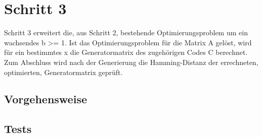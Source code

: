 \section{Schritt 3}
Schritt 3 erweitert die, aus Schritt 2, bestehende Optimierungsproblem  um ein wachsendes b >= 1. Ist das Optimierungsproblem für die Matrix A gelöst, wird für ein bestimmtes x die Generatormatrix des zugehörigen Codes C berechnet.  Zum Abschluss wird nach der Generierung die Hamming-Distanz der errechneten, optimierten, Generatormatrix geprüft.

\subsection{Vorgehensweise}

\subsection{Tests}